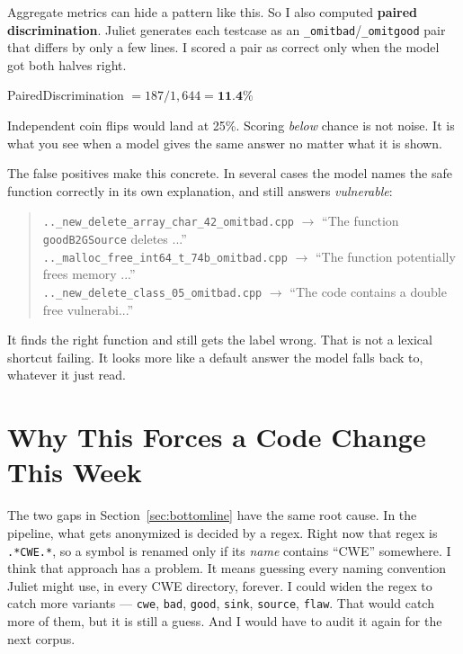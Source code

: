 \documentclass[11pt]{article}
\begin{document}
Aggregate metrics can hide a pattern like this. So I also computed \textbf{paired
discrimination}. Juliet generates each testcase as an \texttt{\_omitbad}/\texttt{\_omitgood} pair
that differs by only a few lines. I scored a pair as correct only when the model got both halves
right.

\begin{center}
PairedDiscrimination $= 187 / 1{,}644 = \textbf{11.4\%}$
\end{center}

Independent coin flips would land at 25\%. Scoring \textit{below} chance is not noise. It is what
you see when a model gives the same answer no matter what it is shown.

The false positives make this concrete. In several cases the model names the safe function
correctly in its own explanation, and still answers \textit{vulnerable}:

\begin{quote}
\texttt{..\_new\_delete\_array\_char\_42\_omitbad.cpp} $\rightarrow$ ``The function
\texttt{goodB2GSource} deletes ...''\\
\texttt{..\_malloc\_free\_int64\_t\_74b\_omitbad.cpp} $\rightarrow$ ``The function potentially
frees memory ...''\\
\texttt{..\_new\_delete\_class\_05\_omitbad.cpp} $\rightarrow$ ``The code contains a double free
vulnerabi...''
\end{quote}

It finds the right function and still gets the label wrong. That is not a lexical shortcut
failing. It looks more like a default answer the model falls back to, whatever it just read.

\section{Why This Forces a Code Change This Week}
\label{sec:fix}

The two gaps in Section~\ref{sec:bottomline} have the same root cause. In the pipeline, what gets
anonymized is decided by a regex. Right now that regex is \texttt{.*CWE.*}, so a symbol is
renamed only if its \textit{name} contains ``CWE'' somewhere. I think that approach has a
problem. It means guessing every naming convention Juliet might use, in every CWE directory,
forever. I
could widen the regex to catch more variants --- \texttt{cwe}, \texttt{bad}, \texttt{good},
\texttt{sink}, \texttt{source}, \texttt{flaw}. That would catch more of them, but it is still a
guess. And I would have to audit it again for the next corpus.
\end{document}
